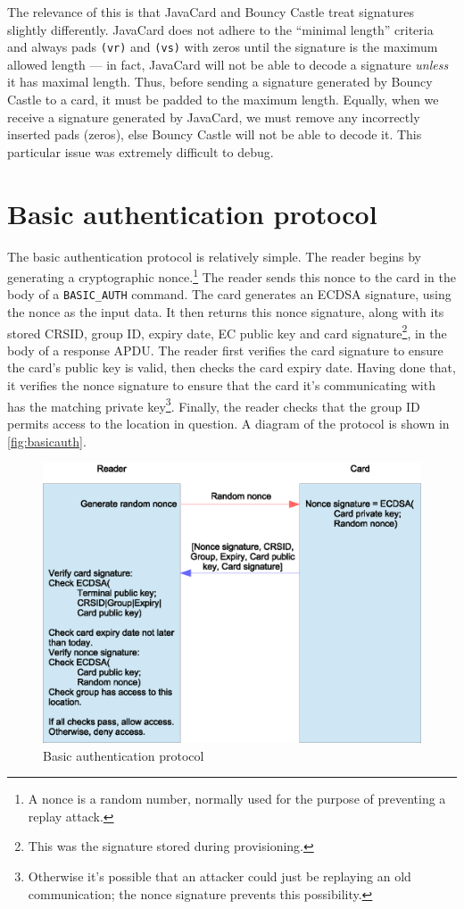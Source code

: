 \documentclass[12pt,a4paper,twoside,openright]{report}
\begin{document}
The relevance of this is that JavaCard and Bouncy Castle treat signatures slightly differently. JavaCard does not adhere to the ``minimal length'' criteria and always pads \texttt{(vr)} and \texttt{(vs)} with zeros until the signature is the maximum allowed length --- in fact, JavaCard will not be able to decode a signature \emph{unless} it has maximal length. Thus, before sending a signature generated by Bouncy Castle to a card, it must be padded to the maximum length. Equally, when we receive a signature generated by JavaCard, we must remove any incorrectly inserted pads (zeros), else Bouncy Castle will not be able to decode it. This particular issue was extremely difficult to debug.

\section{Basic authentication protocol}
\label{basicauth}

The basic authentication protocol is relatively simple. The reader begins by generating a cryptographic nonce.\footnote{A nonce is a random number, normally used for the purpose of preventing a replay attack.} The reader sends this nonce to the card in the body of a \texttt{BASIC\_AUTH} command. The card generates an ECDSA signature, using the nonce as the input data. It then returns this nonce signature, along with its stored CRSID, group ID, expiry date, EC public key and card signature\footnote{This was the signature stored during provisioning.}, in the body of a response APDU. The reader first verifies the card signature to ensure the card's public key is valid, then checks the card expiry date. Having done that, it verifies the nonce signature to ensure that the card it's communicating with has the matching private key\footnote{Otherwise it's possible that an attacker could just be replaying an old communication; the nonce signature prevents this possibility.}. Finally, the reader checks that the group ID permits access to the location in question. A diagram of the protocol is shown in \autoref{fig:basicauth}.

\begin{figure}[tbh]
\centerline{\includegraphics[scale=0.8]{figures/basicauth.eps}}
\caption{Basic authentication protocol}
\label{fig:basicauth}
\end{figure}
\end{document}
